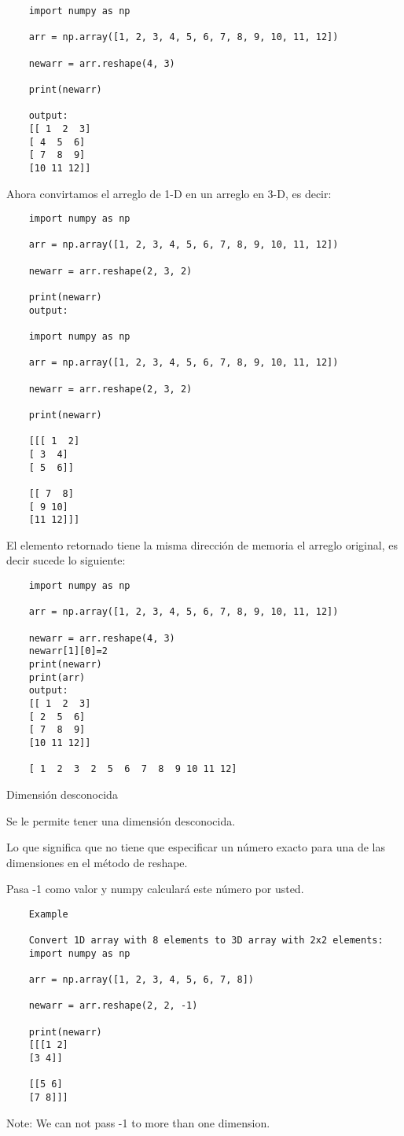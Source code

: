\begin{verbatim}
	import numpy as np
	
	arr = np.array([1, 2, 3, 4, 5, 6, 7, 8, 9, 10, 11, 12])
	
	newarr = arr.reshape(4, 3)
	
	print(newarr)
	
	output:
	[[ 1  2  3]
	[ 4  5  6]
	[ 7  8  9]
	[10 11 12]]
\end{verbatim}

Ahora convirtamos el arreglo de 1-D en un arreglo en 3-D, es decir: 

\begin{verbatim}
	import numpy as np
	
	arr = np.array([1, 2, 3, 4, 5, 6, 7, 8, 9, 10, 11, 12])
	
	newarr = arr.reshape(2, 3, 2)
	
	print(newarr) 
	output:
	
	import numpy as np
	
	arr = np.array([1, 2, 3, 4, 5, 6, 7, 8, 9, 10, 11, 12])
	
	newarr = arr.reshape(2, 3, 2)
	
	print(newarr)
	
	[[[ 1  2]
	[ 3  4]
	[ 5  6]]
	
	[[ 7  8]
	[ 9 10]
	[11 12]]]
\end{verbatim}

El elemento retornado tiene la misma direcci\'on de memoria el arreglo original, es decir sucede lo siguiente:
\begin{verbatim}
	import numpy as np
	
	arr = np.array([1, 2, 3, 4, 5, 6, 7, 8, 9, 10, 11, 12])
	
	newarr = arr.reshape(4, 3)
	newarr[1][0]=2
	print(newarr)
	print(arr)
	output: 
	[[ 1  2  3]
	[ 2  5  6]
	[ 7  8  9]
	[10 11 12]]
	
	[ 1  2  3  2  5  6  7  8  9 10 11 12]
\end{verbatim}

Dimensi\'on desconocida

Se le permite tener una dimensi\'on desconocida.

Lo que significa que no tiene que especificar un n\'umero exacto para una de las dimensiones en el m\'etodo de reshape.

Pasa -1 como valor y numpy calcular\'a este n\'umero por usted.

\begin{verbatim}
	Example
	
	Convert 1D array with 8 elements to 3D array with 2x2 elements:
	import numpy as np
	
	arr = np.array([1, 2, 3, 4, 5, 6, 7, 8])
	
	newarr = arr.reshape(2, 2, -1)
	
	print(newarr) 
	[[[1 2]
	[3 4]]
	
	[[5 6]
	[7 8]]]
\end{verbatim}
Note: We can not pass -1 to more than one dimension.

